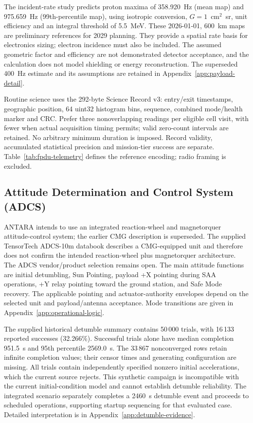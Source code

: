 The incident-rate study predicts proton maxima of 358.920~Hz (mean map) and 975.659~Hz (99th-percentile map), using isotropic conversion, $G=1$~cm$^2$~sr, unit efficiency and an integral threshold of 5.5~MeV. These 2026-01-01, 600~km maps are preliminary references for 2029 planning. They provide a spatial rate basis for electronics sizing; electron incidence must also be included. The assumed geometric factor and efficiency are not demonstrated detector acceptance, and the calculation does not model shielding or energy reconstruction. The superseded 400~Hz estimate and its assumptions are retained in Appendix~\ref{app:payload-detail}.

Routine science uses the 292-byte Science Record v3: entry/exit timestamps, geographic position, 64 uint32 histogram bins, sequence, combined mode/health marker and CRC. Prefer three nonoverlapping readings per eligible cell visit, with fewer when actual acquisition timing permits; valid zero-count intervals are retained. No arbitrary minimum duration is imposed. Record validity, accumulated statistical precision and mission-tier success are separate. Table~\ref{tab:fpdu-telemetry} defines the reference encoding; radio framing is excluded.


\subsection{Attitude Determination and Control System (ADCS)}\label{attitude-determination-and-control-system-adcs}
ANTARA intends to use an integrated reaction-wheel and magnetorquer attitude-control system; the earlier CMG description is superseded. The supplied TensorTech ADCS-10m databook describes a CMG-equipped unit and therefore does not confirm the intended reaction-wheel plus magnetorquer architecture. The ADCS vendor/product selection remains open. The main attitude functions are initial detumbling, Sun Pointing, payload +X pointing during SAA operations, +Y relay pointing toward the ground station, and Safe Mode recovery. The applicable pointing and actuator-authority envelopes depend on the selected unit and payload/antenna acceptance. Mode transitions are given in Appendix~\ref{app:operational-logic}.

The supplied historical detumble summary contains 50\,000 trials, with 16\,133 reported successes (32.266\%). Successful trials alone have median completion 951.5~s and 95th percentile 2569.0~s. The 33\,867 nonconverged rows retain infinite completion values; their censor times and generating configuration are missing. All trials contain independently specified nonzero initial accelerations, which the current source rejects. This synthetic campaign is incompatible with the current initial-condition model and cannot establish detumble reliability. The integrated scenario separately completes a 2460~s detumble event and proceeds to scheduled operations, supporting startup sequencing for that evaluated case. Detailed interpretation is in Appendix~\ref{app:detumble-evidence}.

